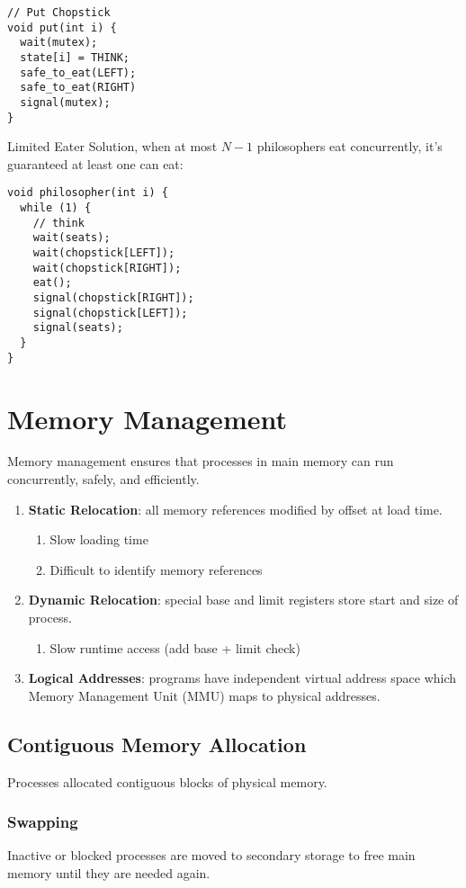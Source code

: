 \documentclass[12pt, a4paper]{article}
\begin{document}
\begin{multicols*}{3}
\begin{minipage}{0.45\columnwidth}
\begin{lstlisting}
// Put Chopstick
void put(int i) {
  wait(mutex);
  state[i] = THINK;
  safe_to_eat(LEFT);
  safe_to_eat(RIGHT)
  signal(mutex);
}
  \end{lstlisting}
  \vfill
\end{minipage}
Limited Eater Solution, when at most $N-1$ philosophers eat concurrently, it's guaranteed at least one can eat:
\begin{lstlisting}
void philosopher(int i) {
  while (1) {
    // think 
    wait(seats);
    wait(chopstick[LEFT]);
    wait(chopstick[RIGHT]);
    eat();
    signal(chopstick[RIGHT]);
    signal(chopstick[LEFT]);
    signal(seats);
  }
}
\end{lstlisting}
\section{Memory Management}
Memory management ensures that processes in main memory can run concurrently, safely, and efficiently.
\begin{enumerate}[\roman*.]
  \item \textbf{Static Relocation}: all memory references modified by offset at load time. 
    \begin{enumerate}[$-$]
      \item Slow loading time
      \item Difficult to identify memory references
    \end{enumerate}
  \item \textbf{Dynamic Relocation}: special base and limit registers store start and size of process.
    \begin{enumerate}[$-$]
      \item Slow runtime access (add base + limit check)
    \end{enumerate}
  \item \textbf{Logical Addresses}: programs have independent virtual address space which Memory Management Unit (MMU) maps to physical addresses.
\end{enumerate}

\subsection{Contiguous Memory Allocation}
Processes allocated contiguous blocks of physical memory. 
\subsubsection{Swapping}
Inactive or blocked processes are moved to secondary storage to free main memory until they are needed again.


\end{multicols*}
\end{document}
